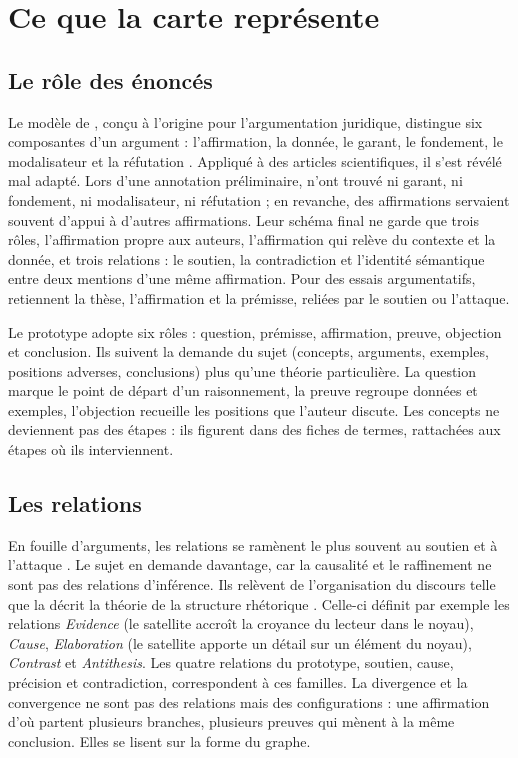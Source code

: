 \section{Ce que la carte représente}
\label{sec:notions}

\subsection{Le rôle des énoncés}

Le modèle de \textcite{ref24}, conçu à l’origine pour l’argumentation juridique, distingue six composantes d’un argument : l’affirmation, la donnée, le garant, le fondement, le modalisateur et la réfutation \parencite[41]{ref08}. Appliqué à des articles scientifiques, il s’est révélé mal adapté. Lors d’une annotation préliminaire, \textcite[41]{ref08} n’ont trouvé ni garant, ni fondement, ni modalisateur, ni réfutation ; en revanche, des affirmations servaient souvent d’appui à d’autres affirmations. Leur schéma final ne garde que trois rôles, l’affirmation propre aux auteurs, l’affirmation qui relève du contexte et la donnée, et trois relations : le soutien, la contradiction et l’identité sémantique entre deux mentions d’une même affirmation. Pour des essais argumentatifs, \textcite{ref07} retiennent la thèse, l’affirmation et la prémisse, reliées par le soutien ou l’attaque.

Le prototype adopte six rôles : question, prémisse, affirmation, preuve, objection et conclusion. Ils suivent la demande du sujet (concepts, arguments, exemples, positions adverses, conclusions) plus qu’une théorie particulière. La question marque le point de départ d’un raisonnement, la preuve regroupe données et exemples, l’objection recueille les positions que l’auteur discute. Les concepts ne deviennent pas des étapes : ils figurent dans des fiches de termes, rattachées aux étapes où ils interviennent.

\subsection{Les relations}

En fouille d’arguments, les relations se ramènent le plus souvent au soutien et à l’attaque \parencite{ref05,ref07}. Le sujet en demande davantage, car la causalité et le raffinement ne sont pas des relations d’inférence. Ils relèvent de l’organisation du discours telle que la décrit la théorie de la structure rhétorique \parencite{ref25}. Celle-ci définit par exemple les relations \emph{Evidence} (le satellite accroît la croyance du lecteur dans le noyau), \emph{Cause}, \emph{Elaboration} (le satellite apporte un détail sur un élément du noyau), \emph{Contrast} et \emph{Antithesis}. Les quatre relations du prototype, soutien, cause, précision et contradiction, correspondent à ces familles. La divergence et la convergence ne sont pas des relations mais des configurations : une affirmation d’où partent plusieurs branches, plusieurs preuves qui mènent à la même conclusion. Elles se lisent sur la forme du graphe.

